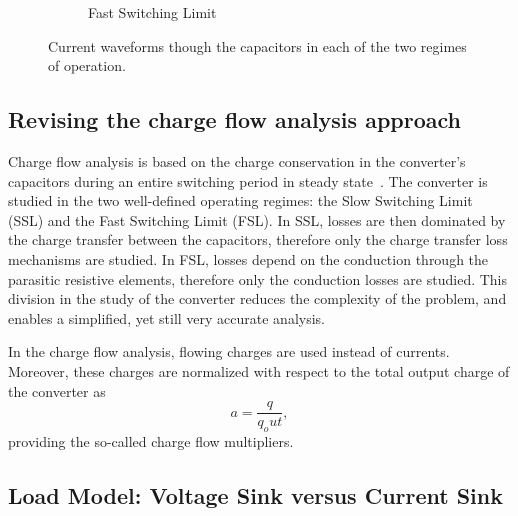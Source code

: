 \begin{figure}[!h]
\begin{subfigure}[t]{.45\textwidth}
    \caption{Fast Switching Limit}
    \label{fig:ic_fsl}
\end{subfigure}
\caption[Current waveforms in the converter's capacitors]{Current waveforms though the capacitors in each of the two regimes of operation. }
\label{fig:capacitor_current}
\end{figure}


\subsection{Revising the charge flow analysis approach}
Charge flow analysis is based on the charge conservation in the converter's capacitors during an entire switching period in steady state~\cite{95Makowski}. The converter is studied in the two well-defined operating regimes: the Slow Switching Limit (SSL) and the Fast Switching Limit (FSL). In SSL, losses are then dominated by the charge transfer between the capacitors, therefore only the charge transfer loss mechanisms are studied.  In FSL, losses depend on the conduction through the parasitic resistive elements, therefore only the conduction losses are studied. This division in the study of the converter reduces the complexity of the problem, and enables a simplified, yet still very accurate analysis.

In the charge flow analysis, flowing charges are used instead of currents. Moreover, these charges are normalized with respect to the total output charge of the converter as
$$
a  = \frac{q}{q_out},
$$
providing the so-called charge flow multipliers. 


\subsection{Load Model: Voltage Sink versus Current Sink}

